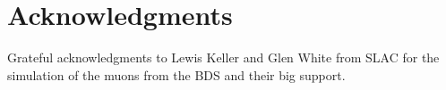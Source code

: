 \documentclass[12pt]{article}
\begin{document}





\section*{Acknowledgments}
Grateful acknowledgments to Lewis Keller and Glen White from SLAC for the simulation of the muons from the BDS and their big support.






\end{document}
